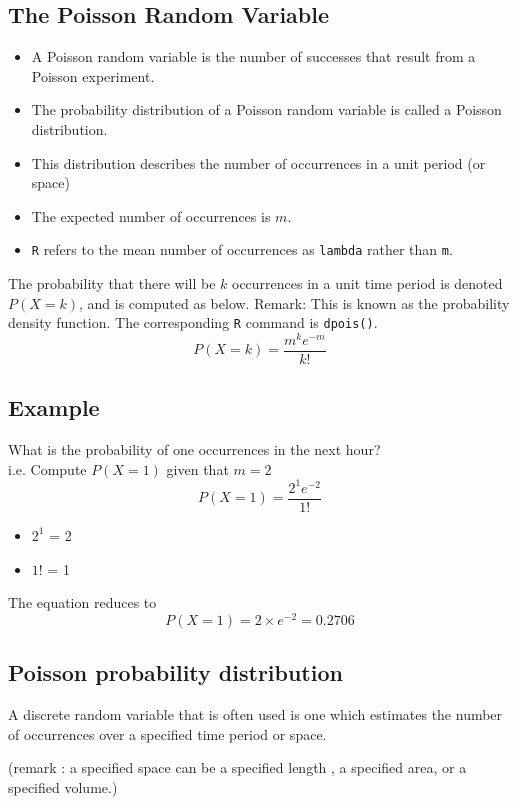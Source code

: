 \documentclass[]{article}
\begin{document}
	\subsection{The Poisson Random Variable}
	\begin{itemize}
		\item A Poisson random variable is the number of successes that result from a Poisson experiment.
		\item The probability distribution of a Poisson random variable is called a Poisson distribution.
		\item This distribution describes the number of occurrences in a unit period (or space)
		\item The expected number of occurrences is $m$.
		\item \texttt{R} refers to the mean number of occurrences as \texttt{lambda} rather than \texttt{m}. 
	\end{itemize}
	
	The probability that there will be $k$ occurrences in a unit time period is denoted $P(X=k)$, and is computed as below. Remark: This is known as the probability density function. The corresponding \texttt{R} command is \texttt{dpois()}.
	\Large
	\[ P(X = k)=\frac{m^k e^{-m}}{k!} \]
	
	
	

	\subsection{Example}
	What is the probability of one occurrences in the next hour? \\ i.e. Compute $P(X=1)$ given that $m=2$
	\Large
	\[ P(X = 1)=\frac{2^1 e^{-2}}{1!} \]
	\normalsize
	\begin{itemize}
		\item $2^1$ = 2
		\item $1!$ = 1
	\end{itemize}
	The equation reduces to
	\[ P(X = 1) = 2 \times e^{-2} = 0.2706\]

\subsection{Poisson probability distribution}

A discrete random variable that is often used is one which estimates the number of occurrences  over a specified time period or space.

(remark : a specified space can be a specified length , a specified area, or a specified volume.)
\end{document}
